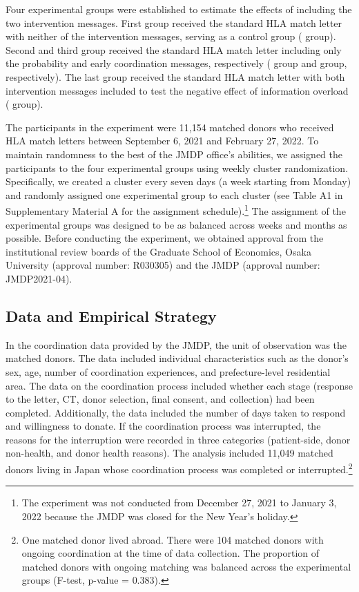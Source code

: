 \documentclass[12pt, a4paper]{article}
\newcommand{\revise}[1]{{\color{red}{#1}}}
\begin{document}
Four experimental groups were established to estimate the effects of including the two intervention messages. First group received the standard HLA match letter with neither of the intervention messages, serving as a control group (\revise{StatusQuo} group). Second and third group received the standard HLA match letter including only the probability and early coordination messages, respectively (\revise{MatchMessage} group and \revise{CoordMessage} group, respectively). The last group received the standard HLA match letter with both intervention messages included to test the negative effect of information overload (\revise{BothMessage} group).

The participants in the experiment were 11,154 matched donors who received HLA match letters between September 6, 2021 and February 27, 2022. To maintain randomness to the best of the JMDP office's abilities, we assigned the participants to the four experimental groups using weekly cluster randomization. Specifically, we created a cluster every seven days (a week starting from Monday) and randomly assigned one experimental group to each cluster (see Table A1 in Supplementary Material A for the assignment schedule).\footnote{The experiment was not conducted from December 27, 2021 to January 3, 2022 because the JMDP was closed for the New Year's holiday.} The assignment of the experimental groups was designed to be as balanced across weeks and months as possible. Before conducting the experiment, we obtained approval from the institutional review boards of the Graduate School of Economics, Osaka University (approval number: R030305) and the JMDP (approval number: JMDP2021-04).

\hypertarget{data-and-empirical-strategy}{%
\subsection{Data and Empirical Strategy}\label{data-and-empirical-strategy}}

In the coordination data provided by the JMDP, the unit of observation was the matched donors. The data included individual characteristics such as the donor's sex, age, number of coordination experiences, and prefecture-level residential area. The data on the coordination process included whether each stage (response to the letter, CT, donor selection, final consent, and collection) had been completed. Additionally, the data included the number of days taken to respond and willingness to donate. If the coordination process was interrupted, the reasons for the interruption were recorded in three categories (patient-side, donor non-health, and donor health reasons). The analysis included 11,049 matched donors living in Japan whose coordination process was completed or interrupted.\footnote{One matched donor lived abroad. There were 104 matched donors with ongoing coordination at the time of data collection. The proportion of matched donors with ongoing matching was balanced across the experimental groups (F-test, p-value = \(0.383\)).}
\end{document}
